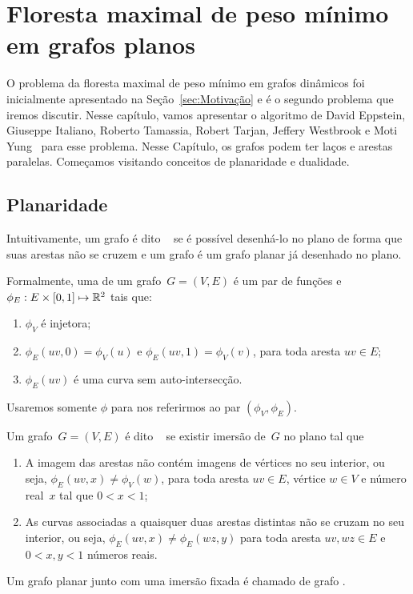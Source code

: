 \chapter{Floresta maximal de peso mínimo em grafos planos}
\label{sec:MSF}

O problema da floresta maximal de peso mínimo em grafos dinâmicos foi inicialmente apresentado na Seção~\ref{sec:Motivação} e é o segundo problema que iremos discutir.
Nesse capítulo, vamos apresentar o algoritmo de David Eppstein, Giuseppe Italiano, Roberto Tamassia, Robert Tarjan, Jeffery Westbrook e Moti Yung~\cite{EPPSTEIN-planar} para esse problema.
Nesse Capítulo, os grafos podem ter laços e arestas paralelas.
Começamos visitando conceitos de planaridade e dualidade.


\section{Planaridade}

Intuitivamente, um grafo é dito ~\cite{planarTheoryAlgorith} se é possível desenhá-lo no plano de forma que suas arestas não se cruzem e um grafo  é um grafo planar já desenhado no plano.

Formalmente, uma  de um grafo~$G=(V,E)$ é um par de funções  e $\phi_E: E\times [0,1]\mapsto \mathbb{R}^2$ tais que:
\begin{enumerate}
\item $\phi_V$ é injetora; 
\item $\phi_E(uv,0) = \phi_V(u)$ e $\phi_E(uv,1) = \phi_V(v)$, para toda aresta $uv\in E$;
\item $\phi_E(uv)$ é uma curva sem auto-intersecção.
\end{enumerate}
Usaremos somente $\phi$ para nos referirmos ao par $(\phi_V,\phi_E)$.

Um grafo~$G=(V,E)$ é dito ~\cite{noma2003} se existir imersão de~$G$ no plano tal que
\begin{enumerate}
\item A imagem das arestas não contém imagens de vértices no seu interior, ou seja, $\phi_E(uv,x) \neq \phi_V(w)$, para toda aresta $uv\in E$, vértice $w\in V$ e número real~$x$ tal que $0<x<1$;
\item As curvas associadas a quaisquer duas arestas distintas não se cruzam no seu interior, ou seja, $\phi_E(uv,x)\neq \phi_E(wz,y)$ para toda aresta $uv,wz\in E$ e $0<x,y<1$ números reais.
\end{enumerate}
Um grafo planar junto com uma imersão fixada é chamado de grafo .


